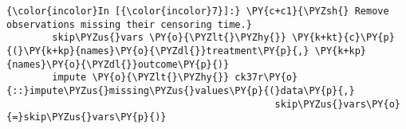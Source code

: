    \begin{Verbatim}[commandchars=\\\{\}]
{\color{incolor}In [{\color{incolor}7}]:} \PY{c+c1}{\PYZsh{} Remove observations missing their censoring time.}
        skip\PYZus{}vars \PY{o}{\PYZlt{}\PYZhy{}} \PY{k+kt}{c}\PY{p}{(}\PY{k+kp}{names}\PY{o}{\PYZdl{}}treatment\PY{p}{,} \PY{k+kp}{names}\PY{o}{\PYZdl{}}outcome\PY{p}{)}
        impute \PY{o}{\PYZlt{}\PYZhy{}} ck37r\PY{o}{::}impute\PYZus{}missing\PYZus{}values\PY{p}{(}data\PY{p}{,}
                                               skip\PYZus{}vars\PY{o}{=}skip\PYZus{}vars\PY{p}{)}
\end{Verbatim}

